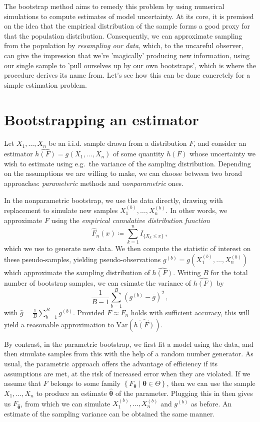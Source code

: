 \documentclass[a4paper]{book}
\begin{document}
The bootstrap method aims to remedy this problem by using numerical simulations to compute estimates of model uncertainty. At its core, it is premised on the idea that the empirical distribution of the sample forms a good proxy for that the population distribution. Consequently, we can approximate sampling from the population by \emph{resampling our data}, which, to the uncareful observer, can give the impression that we're 'magically' producing new information, using our single sample to 'pull ourselves up by our own bootstraps', which is where the procedure derives its name from. Let's see how this can be done concretely for a simple estimation problem.

\section{Bootstrapping an estimator}

Let $X_1, \dots, X_n$ be an i.i.d. sample drawn from a distribution $F$, and consider an estimator $\widehat{h(F)} = g(X_1, \dots, X_n)$ of some quantity $h(F)$ whose uncertainty we wish to estimate using e.g.\ the variance of the sampling distribution. Depending on the assumptions we are willing to make, we can choose between two broad approaches: \emph{parameteric} methods and \emph{nonparametric} ones.

In the nonparametric bootstrap, we use the data directly, drawing with replacement to simulate new samples $X^{(b)}_1, \dots, X^{(b)}_n$. In other words, we approximate $F$ using the \emph{empirical cumulative distribution function}
\begin{equation}
  \widehat{F}_n(x) \coloneqq \sum_{k=1}^n I_{\{ X_k \leq x \}} \,,
\end{equation}
which we use to generate new data. We then compute the statistic of interest on these pseudo-samples, yielding pseudo-observations $g^{(b)} = g(X^{(b)}_1, \dots, X^{(b)}_n)$ which approximate the sampling distribution of $\widehat{h(F)}$. Writing $B$ for the total number of bootstrap samples, we can esimate the variance of $\widehat{h(F)}$ by
\begin{equation}
  \frac{1}{B-1}\sum_{b=1}^B(g^{(b)} - \bar{g})^2 \,,
\end{equation}
with $\bar{g} = \frac{1}{B} \sum_{b=1}^B g^{(b)}$. Provided $F \approx \widehat{F}_n$ holds with sufficient accuracy, this will yield a reasonable approximation to $\mathrm{Var}(\widehat{h(F)})$.

By contrast, in the parametric bootstrap, we first fit a model using the data, and then simulate samples from this with the help of a random number generator. As usual, the parametric approach offers the advantage of efficiency if its assumptions are met, at the risk of increased error when they are violated. If we assume that $F$ belongs to some family $\left \{ F_{\bm{\theta}} \mid  \bm{\theta} \in \Theta \right \}$, then we can use the sample $X_1, \dots, X_n$ to produce an estimate $\bm{\widehat{\theta}}$ of the parameter. Plugging this in then gives us $F_{\bm{\widehat{\theta}}}$, from which we can simulate $X^{(b)}_1, \dots , X^{(b)}_n$ and $g^{(b)}$ as before. An estimate of the sampling variance can be obtained the same manner.
\end{document}
